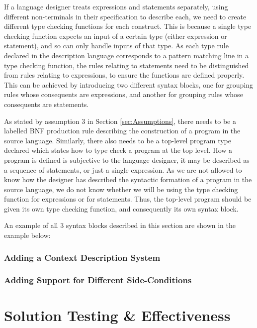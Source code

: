 \documentclass{UoYCSproject}
\begin{document}
If a language designer treats expressions and statements separately, using 
different non-terminals in their specification to describe each, we need to
create different type checking functions for each construct. This is because
a single type checking function expects an input of a certain type (either 
expression or statement), and so can only handle inputs of that type. As each
type rule declared in the description language corresponds to a pattern matching
line in a type checking function, the rules relating to statements need to be
distinguished from rules relating to expressions, to ensure the functions are
defined properly. This can be achieved by introducing two different syntax blocks,
one for grouping rules whose consequents are expressions, and another for
grouping rules whose consequents are statements. 

As stated by assumption 3 in Section \ref{sec:Assumptions}, there needs to be
a labelled BNF production rule describing the construction of a program in the
source language. Similarly, there also needs to be a top-level program type
declared which states how to type check a program at the top level. How
a program is defined is subjective to the language designer, it may be described
as a sequence of statements, or just a single expression. As we are not allowed
to know how the designer has described the syntactic formation of a program in
the source language, we do not know whether we will be using the type checking
function for expressions or for statements. Thus, the top-level program should
be given its own type checking function, and consequently its own syntax block.

An example of all 3 syntax blocks described in this section are shown in the
example below:


\subsection{Adding a Context Description System}

\subsection{Adding Support for Different Side-Conditions}

\chapter{Solution Testing \& Effectiveness}
\end{document}
